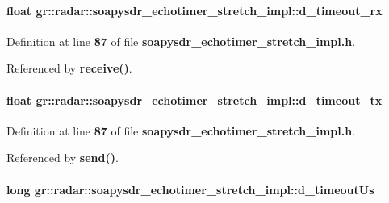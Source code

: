 \paragraph[{d\+\_\+timeout\+\_\+rx}]{\setlength{\rightskip}{0pt plus 5cm}float gr\+::radar\+::soapysdr\+\_\+echotimer\+\_\+stretch\+\_\+impl\+::d\+\_\+timeout\+\_\+rx\hspace{0.3cm}{\ttfamily [private]}}\label{classgr_1_1radar_1_1soapysdr__echotimer__stretch__impl_a03f567e28b71bd659062316d0f0b66b9}


Definition at line {\bf 87} of file {\bf soapysdr\+\_\+echotimer\+\_\+stretch\+\_\+impl.\+h}.



Referenced by {\bf receive()}.

\paragraph[{d\+\_\+timeout\+\_\+tx}]{\setlength{\rightskip}{0pt plus 5cm}float gr\+::radar\+::soapysdr\+\_\+echotimer\+\_\+stretch\+\_\+impl\+::d\+\_\+timeout\+\_\+tx\hspace{0.3cm}{\ttfamily [private]}}\label{classgr_1_1radar_1_1soapysdr__echotimer__stretch__impl_ab83cd8cf0316bbb651114d562a143d1d}


Definition at line {\bf 87} of file {\bf soapysdr\+\_\+echotimer\+\_\+stretch\+\_\+impl.\+h}.



Referenced by {\bf send()}.

\paragraph[{d\+\_\+timeout\+Us}]{\setlength{\rightskip}{0pt plus 5cm}long gr\+::radar\+::soapysdr\+\_\+echotimer\+\_\+stretch\+\_\+impl\+::d\+\_\+timeout\+Us\hspace{0.3cm}{\ttfamily [private]}}\label{classgr_1_1radar_1_1soapysdr__echotimer__stretch__impl_a3b2dc2f9c94c1e7d64547589099c6d1e}


